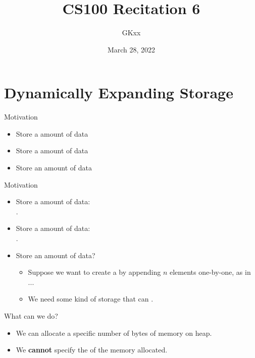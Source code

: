\documentclass{beamer}
\title{CS100 Recitation 6}
\author{GKxx}
\date{March 28, 2022}
\begin{document}
\begin{frame}
    \maketitle
\end{frame}

\section{Dynamically Expanding Storage}

\begin{frame}{Motivation}
    \begin{itemize}
        \item Store a  amount of data
        \item Store a  amount of data
        \item Store an  amount of data
    \end{itemize}
\end{frame}

\begin{frame}{Motivation}
    \begin{itemize}
        \item Store a  amount of data:\\
        .
        \item Store a  amount of data:\\
        .
        \item Store an  amount of data?
        \pause
        \begin{itemize}
            \item Suppose we want to create a  by appending \(n\) elements one-by-one, as in ...
            \pause
            \item We need some kind of storage that can .
        \end{itemize}
    \end{itemize}
\end{frame}

\begin{frame}{What can we do?}
    \begin{itemize}
        \item We can allocate a specific number of bytes of memory on heap.
        \item We \textbf{cannot} specify the  of the memory allocated. 
    \end{itemize}
\end{frame}
\end{document}
